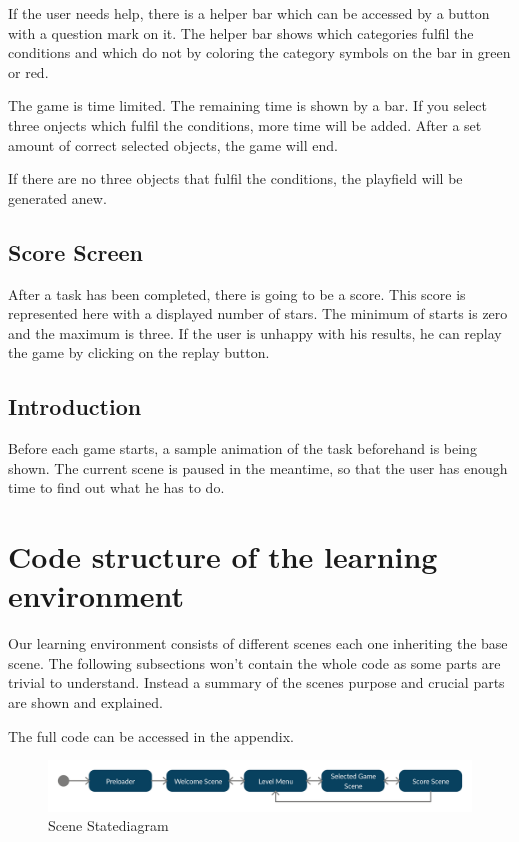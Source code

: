 If the user needs help, there is a helper bar which can be accessed by a button with a question mark on it.
The helper bar shows which categories fulfil the conditions and which do not
by coloring the category symbols on the bar in green or red.

The game is time limited. The remaining time is shown by a bar.
If you select three onjects which fulfil the conditions, more time will be added.
After a set amount of correct selected objects, the game will end.

If there are no three objects that fulfil the conditions, the playfield will be generated anew.

\subsection{Score Screen}\label{subsec:score-screen}
After a task has been completed, there is going to be a score.
This score is represented here with a displayed number of stars.
The minimum of starts is zero and the maximum is three.
If the user is unhappy with his results, he can replay the game by clicking on the replay button.

\subsection{Introduction}\label{subsec:introduction}
Before each game starts, a sample animation of the task beforehand is being shown.
The current scene is paused in the meantime, so that the user has enough time to find out what he has to do.

\section{Code structure of the learning environment}\label{sec:code-structure-of-the-learning-environment}
Our learning environment consists of different scenes each one inheriting the base scene.
The following subsections won't contain the whole code as some parts are trivial to understand.
Instead a summary of the scenes purpose and crucial parts are shown and explained.

The full code can be accessed in the appendix.

\begin{figure}[H]
    \centering
    \includegraphics[width=1\textwidth]{figures/statediagram}
    \caption{Scene Statediagram}
    \label{fig:statediagram}
\end{figure}


